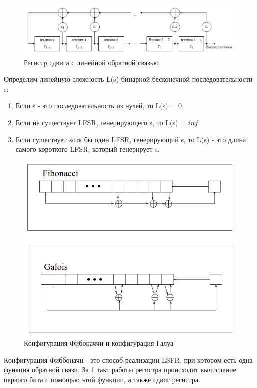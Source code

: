\documentclass[colorthm]{./civarticle}
\begin{document}
\begin{figure}[H]
    \centering
    \includegraphics[width=0.75\linewidth]{LFSR3.png}
    \caption{Регистр сдвига с линейной обратной связью}
    \label{fig:enter-label}
\end{figure}

\begin{definition}
  Определим линейную сложность L(s) бинарной бесконечной последовательности s:
  \begin{enumerate}
        \item Если s - это последовательность из нулей, то L(s) = 0.
        \item Если не существует LFSR, генерирующего s, то L(s) = $inf$
        \item Если существует хотя бы один LFSR, генерирующий s, то L(s) - это длина самого короткого LFSR, который генерирует s.
    \end{enumerate}
\end{definition}

\begin{figure}[H]
    \centering
    \includegraphics[width=0.75\linewidth]{фибо_галуа.png}
    \caption{Конфигурация Фибоначчи и конфигурация Галуа}
    \label{fig:enter-label}
\end{figure}

\begin{definition}
  Конфигурация Фиббоначи - это способ реализации LSFR, при котором есть одна функция обратной связи. За 1 такт работы регистра происходит вычисление первого бита с помощью этой функции, а также сдвиг регистра.
\end{definition}
\end{document}
